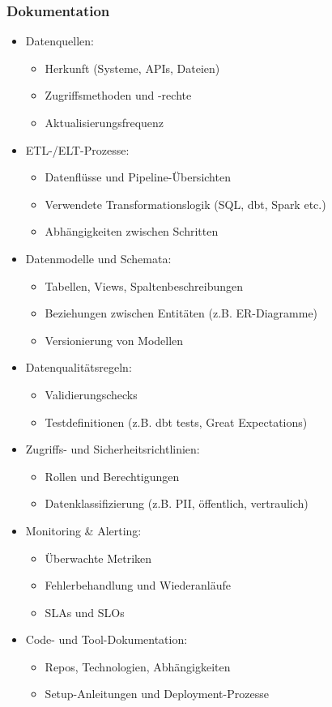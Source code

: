 \documentclass[11pt]{scrartcl}
\begin{document}
\subsubsection*{Dokumentation}
\begin{itemize}
	\item Datenquellen:
	\begin{itemize}
		\item Herkunft (Systeme, APIs, Dateien)
		\item Zugriffsmethoden und -rechte
		\item Aktualisierungsfrequenz
	\end{itemize}
	\item ETL-/ELT-Prozesse:
	\begin{itemize}
		\item Datenflüsse und Pipeline-Übersichten
		\item Verwendete Transformationslogik (SQL, dbt, Spark etc.)
		\item Abhängigkeiten zwischen Schritten
	\end{itemize}
	\item Datenmodelle und Schemata:
	\begin{itemize}
		\item Tabellen, Views, Spaltenbeschreibungen
		\item Beziehungen zwischen Entitäten (z.B. ER-Diagramme)
		\item Versionierung von Modellen
	\end{itemize}
	\item Datenqualitätsregeln:
	\begin{itemize}
		\item Validierungschecks
		\item Testdefinitionen (z.B. dbt tests, Great Expectations)
	\end{itemize}
	\item Zugriffs- und Sicherheitsrichtlinien:
	\begin{itemize}
		\item Rollen und Berechtigungen
		\item Datenklassifizierung (z.B. PII, öffentlich, vertraulich)
	\end{itemize}
	\item Monitoring \& Alerting:
	\begin{itemize}
		\item Überwachte Metriken
		\item Fehlerbehandlung und Wiederanläufe
		\item SLAs und SLOs
	\end{itemize}
	\item Code- und Tool-Dokumentation:
	\begin{itemize}
		\item Repos, Technologien, Abhängigkeiten
		\item Setup-Anleitungen und Deployment-Prozesse
	\end{itemize}
\end{itemize}
\end{document}
